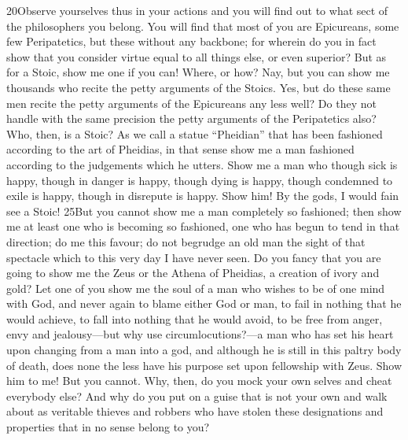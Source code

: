 20Observe yourselves thus in your actions and you will find out to what sect of the philosophers you belong. You will find that most of you are Epicureans, some few Peripatetics, but these without any backbone; for wherein do you in fact show that you consider virtue equal to all things else, or even superior? But as for a Stoic, show me one if you can! Where, or how? Nay, but you can show me thousands who recite the petty arguments of the Stoics. Yes, but do these same men recite the petty arguments of the Epicureans any less well? Do they not handle with the same precision the petty arguments of the Peripatetics also? Who, then, is a Stoic? As we call a statue ``Pheidian'' that has been fashioned according to the art of Pheidias, in that sense show me a man fashioned according to the judgements which he utters. Show me a man who though sick is happy, though in danger is happy, though dying is happy, though condemned to exile is happy, though in disrepute is happy. Show him! By the gods, I would fain see a Stoic! 25But you cannot show me a man completely so fashioned; then show me at least one who is becoming so fashioned, one who has begun to tend in that direction; do me this favour; do not begrudge an old man the sight of that spectacle which to this very day I have never seen. Do you fancy that you are going to show me the Zeus or the Athena of Pheidias, a creation of ivory and gold? Let one of you show me the soul of a man who wishes to be of one mind with God, and never again to blame either God or man, to fail in nothing that he would achieve, to fall into nothing that he would avoid, to be free from anger, envy and jealousy—but why use circumlocutions?—a man who has set his heart upon changing from a man into a god, and although he is still in this paltry body of death, does none the less have his purpose set upon fellowship with Zeus. Show him to me! But you cannot. Why, then, do you mock your own selves and cheat everybody else? And why do you put on a guise that is not your own and walk about as veritable thieves and robbers who have stolen these designations and properties that in no sense belong to you?

